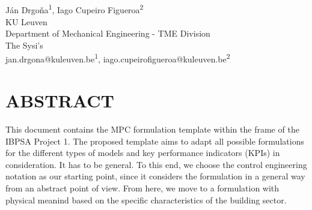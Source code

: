 \documentclass[10pt]{extarticle}
\begin{document}
	
\begin{center}
\vspace{0.2in}
\\[14pt]

{\fontsize{11pt}{1.2em}\selectfont
 J\'an Drgo\v na\textsuperscript{1}, Iago Cupeiro Figueroa\textsuperscript{2}
\\[11pt]

KU Leuven\\
Department of Mechanical Engineering - TME Division\\
The Sysi's \\[11pt]

jan.drgona@kuleuven.be\textsuperscript{1},
iago.cupeirofigueroa@kuleuven.be\textsuperscript{2} \\
}
\end{center}

\vspace{0.5cm}


\section*{ABSTRACT}

This document contains the MPC formulation template within the frame of the IBPSA Project 1.
The proposed template aims to adapt all possible formulations for the different types of models and key performance indicators (KPIs) in consideration.
It has to be general.
To this end, we choose the control engineering notation as our starting point,
since it considers the formulation in a general way from an abstract point of view.
From here, we  move to a formulation with physical meanind based on the specific characteristics of the building sector.

%
%	
\end{document}
